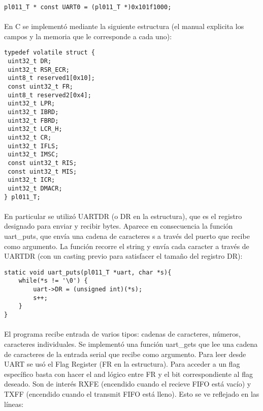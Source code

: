 \documentclass{article}
\begin{document}
\begin{lstlisting}
pl011_T * const UART0 = (pl011_T *)0x101f1000;
\end{lstlisting}

\paragraph{}
En C se implement\'o mediante la siguiente estructura (el manual explicita los campos y la memoria que le corresponde a cada uno):\cite{UARTManual}

\begin{lstlisting}
typedef volatile struct {
 uint32_t DR;
 uint32_t RSR_ECR;
 uint8_t reserved1[0x10];
 const uint32_t FR;
 uint8_t reserved2[0x4];
 uint32_t LPR;
 uint32_t IBRD;
 uint32_t FBRD;
 uint32_t LCR_H;
 uint32_t CR;
 uint32_t IFLS;
 uint32_t IMSC;
 const uint32_t RIS;
 const uint32_t MIS;
 uint32_t ICR;
 uint32_t DMACR;
} pl011_T;
\end{lstlisting}

\paragraph{}
En particular se utiliz\'o UARTDR (o DR en la estructura), que es el registro designado para enviar y recibir bytes. Aparece en consecuencia la funci\'on uart\_puts, que env\'ia una cadena de caracteres s a trav\'es del puerto que recibe como argumento. La funci\'on recorre el string y env\'ia cada caracter a trav\'es de UARTDR (con un casting previo para satisfacer el tama\~no del registro DR):


\begin{lstlisting}
static void uart_puts(pl011_T *uart, char *s){
	while(*s != '\0') {
		uart->DR = (unsigned int)(*s);
		s++;
	}
}
\end{lstlisting}

\paragraph{}
El programa recibe entrada de varios tipos: cadenas de caracteres, n\'umeros, caracteres individuales. Se implement\'o una funci\'on uart\_gets que lee una cadena de caracteres de la entrada serial que recibe como argumento. Para leer desde UART se us\'o el Flag Register (FR en la estructura). Para acceder a un flag espec\'ifico basta con hacer el and l\'ogico entre FR y el bit correspondiente al flag deseado. Son de inter\'es RXFE (encendido cuando el recieve FIFO est\'a vac\'io) y TXFF (encendido cuando el transmit FIFO est\'a lleno). Esto se ve reflejado en las l\'ineas:
\end{document}
